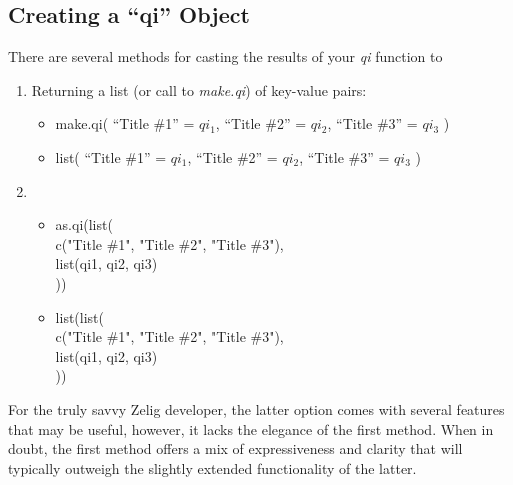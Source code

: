 \subsection{Creating a ``qi'' Object}

There are several methods for casting the results of your \emph{qi} function to 

\begin{enumerate}
	\item{Returning a list (or call to \emph{make.qi}) of key-value pairs:
	\begin{itemize}
		\item{make.qi(	``Title \#1'' = $qi_1$,
						``Title \#2'' = $qi_2$,
						``Title \#3'' = $qi_3$
						)}
		\item{list(	``Title \#1'' = $qi_1$,
						``Title \#2'' = $qi_2$,
						``Title \#3'' = $qi_3$
						)}
	\end{itemize}}

	\item{
	\begin{itemize}
		\item{as.qi(list(\\
			c("Title \#1", "Title \#2", "Title \#3"),\\
			list(qi1, qi2, qi3) \\
						))}
		\item{list(list(\\
			c("Title \#1", "Title \#2", "Title \#3"),\\
			list(qi1, qi2, qi3) \\
						))}
	\end{itemize}}
\end{enumerate}

For the truly savvy Zelig developer, the latter option comes with several features that may be useful, however, it lacks the elegance of the first method.  When in doubt, the first method offers a mix of expressiveness and clarity that will typically outweigh the slightly extended functionality of the latter.